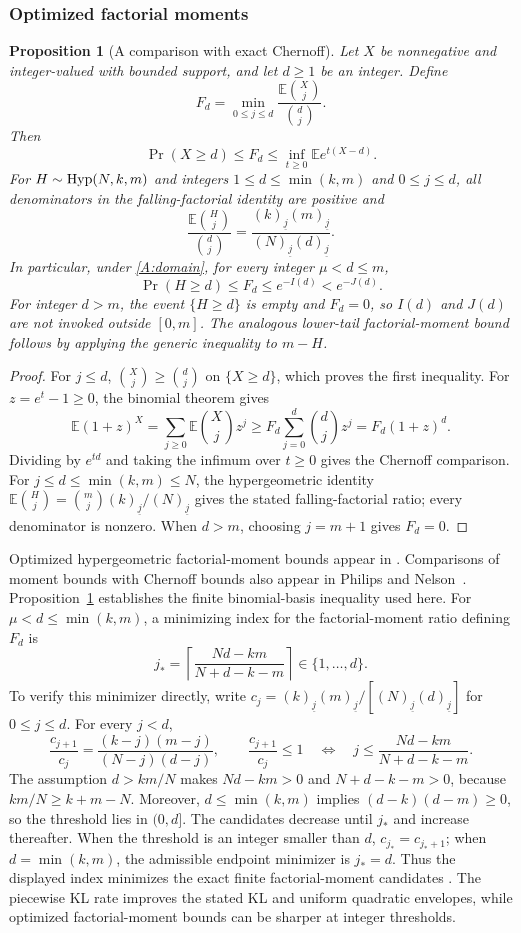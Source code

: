 \documentclass[11pt,a4paper]{article}
\newtheorem{proposition}[theorem]{Proposition}
\newcommand{\E}{\mathbb E}\newcommand{\R}{\mathbb R}\newcommand{\N}{\mathbb N}\newcommand{\one}{\mathbf1}
\begin{document}
\subsubsection{Optimized factorial moments}
\begin{proposition}[A comparison with exact Chernoff]\label{A:factorial}
Let $X$ be nonnegative and integer-valued with bounded support, and let
$d\ge1$ be an integer. Define
\[
 F_d=\min_{0\le j\le d}\frac{\E\binom Xj}{\binom dj}.
\]
Then
\[
 \Pr(X\ge d)\le F_d\le
 \inf_{t\ge0}\E e^{t(X-d)}.
\]
For $H\sim\operatorname{Hyp}(N,k,m)$ and integers $1\le d\le\min(k,m)$ and $0\le j\le d$, all denominators in the falling-factorial identity are positive and
\[
 \frac{\E\binom Hj}{\binom dj}
 =\frac{(k)_{\underline j}(m)_{\underline j}}
 {(N)_{\underline j}(d)_{\underline j}}.
\]
In particular, under \eqref{A:domain}, for every integer $\mu<d\le m$,
\[
 \Pr(H\ge d)\le F_d\le e^{-I(d)}<e^{-J(d)}.
\]
For integer $d>m$, the event $\{H\ge d\}$ is empty and $F_d=0$, so $I(d)$ and $J(d)$ are not invoked outside $[0,m]$. The analogous lower-tail factorial-moment bound follows by applying the generic inequality to $m-H$.
\end{proposition}
\begin{proof}
For $j\le d$, $\binom Xj\ge\binom dj$ on $\{X\ge d\}$, which proves
the first inequality. For $z=e^t-1\ge0$, the binomial theorem gives
\[
 \E(1+z)^X=\sum_{j\ge0}\E\binom Xj z^j
 \ge F_d\sum_{j=0}^d\binom dj z^j=F_d(1+z)^d.
\]
Dividing by $e^{td}$ and taking the infimum over $t\ge0$ gives the Chernoff comparison. For $j\le d\le\min(k,m)\le N$, the hypergeometric identity $\E\binom Hj=\binom mj(k)_{\underline j}/(N)_{\underline j}$ gives the stated falling-factorial ratio; every denominator is nonzero. When $d>m$, choosing $j=m+1$ gives $F_d=0$.
\end{proof}

Optimized hypergeometric factorial-moment bounds appear in \cite{A:MZC}. Comparisons of moment bounds with Chernoff bounds also appear in Philips and Nelson~\cite{A:PN}. Proposition~\ref{A:factorial} establishes the finite binomial-basis inequality used here.
For $\mu<d\le\min(k,m)$, a minimizing index for the factorial-moment ratio defining $F_d$ is
\[
 j_* =\left\lceil\frac{Nd-km}{N+d-k-m}\right\rceil\in\{1,\ldots,d\}.
\]
To verify this minimizer directly, write $c_j=(k)_{\underline j}(m)_{\underline j}/[(N)_{\underline j}(d)_{\underline j}]$ for $0\le j\le d$. For every $j<d$,
\[
 \frac{c_{j+1}}{c_j}=\frac{(k-j)(m-j)}{(N-j)(d-j)},\qquad
 \frac{c_{j+1}}{c_j}\le1
 \quad\Longleftrightarrow\quad
 j\le\frac{Nd-km}{N+d-k-m}.
\]
The assumption $d>km/N$ makes $Nd-km>0$ and $N+d-k-m>0$, because $km/N\ge k+m-N$. Moreover, $d\le\min(k,m)$ implies $(d-k)(d-m)\ge0$, so the threshold lies in $(0,d]$. The candidates decrease until $j_*$ and increase thereafter. When the threshold is an integer smaller than $d$, $c_{j_*}=c_{j_*+1}$; when $d=\min(k,m)$, the admissible endpoint minimizer is $j_*=d$. Thus the displayed index minimizes the exact finite factorial-moment candidates . The piecewise KL rate improves the stated KL and uniform quadratic envelopes, while optimized factorial-moment bounds can be sharper at integer thresholds.
\end{document}
